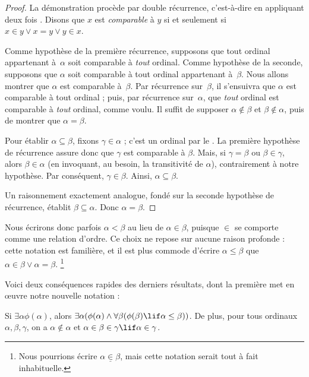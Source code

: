 \documentclass[../../../include/open-logic-section]{subfiles}
\begin{document}
\begin{proof}
La démonstration procède par double récurrence, c'est-à-dire en
appliquant deux fois . Disons que $x$ est
\emph{comparable} à $y$ si et seulement si
$x \in y \lor x = y \lor y \in x$.

Comme hypothèse de la première récurrence, supposons que tout ordinal
appartenant à~$\alpha$ soit comparable à \emph{tout} ordinal. Comme
hypothèse de la seconde, supposons que $\alpha$ soit comparable à
tout ordinal appartenant à~$\beta$. Nous allons montrer que $\alpha$
est comparable à~$\beta$. Par récurrence sur~$\beta$, il s'ensuivra
que $\alpha$ est comparable à tout ordinal ; puis, par récurrence
sur~$\alpha$, que \emph{tout} ordinal est comparable à \emph{tout}
ordinal, comme voulu. Il suffit de supposer $\alpha \notin \beta$ et
$\beta \notin \alpha$, puis de montrer que $\alpha = \beta$.

Pour établir $\alpha \subseteq \beta$, fixons $\gamma \in \alpha$ ;
c'est un ordinal par le . La première hypothèse de
récurrence assure donc que $\gamma$ est comparable à $\beta$. Mais,
si $\gamma = \beta$ ou $\beta \in \gamma$, alors
$\beta \in \alpha$ (en invoquant, au besoin, la transitivité de
$\alpha$), contrairement à notre hypothèse. Par conséquent,
$\gamma \in \beta$. Ainsi, $\alpha \subseteq \beta$.

Un raisonnement exactement analogue, fondé sur la seconde hypothèse
de récurrence, établit $\beta \subseteq \alpha$. Donc
$\alpha = \beta$.
\end{proof}\noindent Nous écrirons donc parfois $\alpha <\beta$ au
lieu de $\alpha \in \beta$, puisque $\in$ se comporte comme une
relation d'ordre. Ce choix ne repose sur aucune raison profonde :
cette notation est familière, et il est plus commode d'écrire
$\alpha \leq \beta$ que $\alpha \in \beta \lor \alpha = \beta$.
\footnote{Nous pourrions écrire $\alpha
\mathrel{\underline{\in}} \beta$, mais cette notation serait tout à
fait inhabituelle.}

Voici deux conséquences rapides des derniers résultats, dont la
première met en œuvre notre nouvelle notation :

\begin{cor}
Si $\exists \alpha\phi(\alpha)$, alors $\exists \alpha(\phi(\alpha)
\land \forall \beta(\phi(\beta) \lif \alpha \leq \beta))$.
De plus, pour tous ordinaux $\alpha, \beta, \gamma$, on a
$\alpha \notin \alpha$ et
$\alpha \in \beta \in \gamma \lif \alpha \in \gamma$.
\end{cor}
\end{document}
